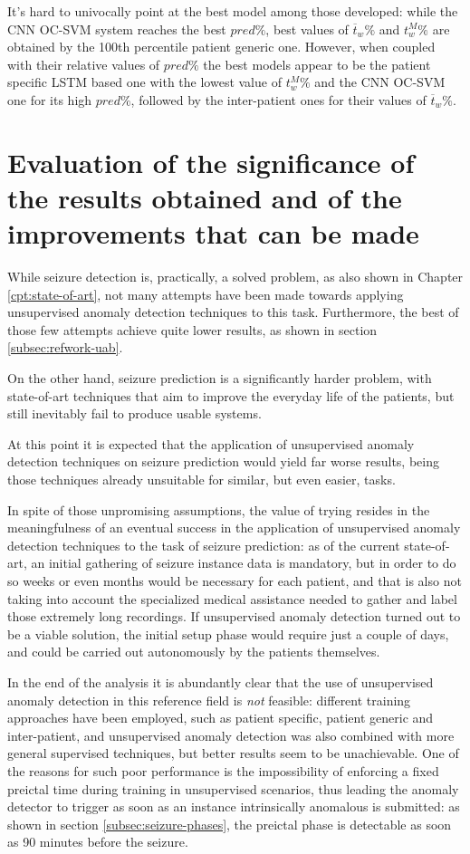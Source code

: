 It's hard to univocally point at the best model among those developed: while the \gls{CNN} \gls{OC-SVM} system reaches the best $pred\%$, best values of  $\overline{t}_w\%$ and $t_w^M\%$ are obtained by the 100th percentile patient generic one. However, when coupled with their relative values of $pred\%$ the best models appear to be the patient specific \gls{LSTM} based one with the lowest value of $t_w^M\%$ and the \gls{CNN} \gls{OC-SVM} one for its high $pred\%$, followed by the inter-patient ones for their values of $\overline{t}_w\%$.

\section{Evaluation of the significance of the results obtained and of the improvements that can be made}
While seizure detection is, practically, a solved problem, as also shown in Chapter \ref{cpt:state-of-art}, not many attempts have been made towards applying unsupervised anomaly detection techniques to this task. Furthermore, the best of those few attempts achieve quite lower results, as shown in section \ref{subsec:refwork-uab}.

On the other hand, seizure prediction is a significantly harder problem, with state-of-art techniques that aim to improve the everyday life of the patients, but still inevitably fail to produce usable systems.

At this point it is expected that the application of unsupervised anomaly detection techniques on seizure prediction would yield far worse results, being those techniques already unsuitable for similar, but even easier, tasks.

In spite of those unpromising assumptions, the value of trying resides in the meaningfulness of an eventual success in the application of unsupervised anomaly detection techniques to the task of seizure prediction: as of the current state-of-art, an initial gathering of seizure instance data is mandatory, but in order to do so weeks or even months would be necessary for each patient, and that is also not taking into account the specialized medical assistance needed to gather and label those extremely long recordings. If unsupervised anomaly detection turned out to be a viable solution, the initial setup phase would require just a couple of days, and could be carried out autonomously by the patients themselves.

In the end of the analysis it is abundantly clear that the use of unsupervised anomaly detection in this reference field is \textit{not} feasible: different training approaches have been employed, such as patient specific, patient generic and inter-patient, and unsupervised anomaly detection was also combined with more general supervised techniques, but better results seem to be unachievable. One of the reasons for such poor performance is the impossibility of enforcing a fixed preictal time during training in unsupervised scenarios, thus leading the anomaly detector to trigger as soon as an instance intrinsically anomalous is submitted: as shown in section \ref{subsec:seizure-phases}, the preictal phase is detectable as soon as 90 minutes before the seizure.

